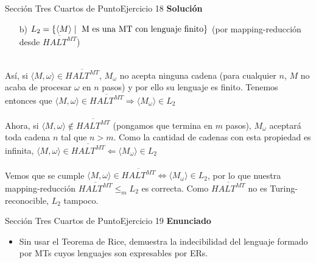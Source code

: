 \documentclass[10pt, envcountsect, presentation, aspectratio=169]{beamer}
\begin{document}

\begin{frame}{Sección Tres Cuartos de Punto}{Ejercicio 18}
    \textbf{Solución}\\
    \begin{itemize}
        \item[b)] $L_2=\{\langle M \rangle \mid \hbox{ M es una MT con lenguaje finito}  \}$ (por mapping-reducción desde $\overline{HALT^{MT}}$) \\~\\
    \end{itemize}
    Así, si $\langle M, \omega \rangle \in \overline{HALT^{MT}}$, $M_{\omega}$ no acepta ninguna cadena (para cualquier $n$, $M$ no acaba de procesar $\omega$ en $n$ pasos) y por ello su lenguaje es finito. Tenemos entonces que $\langle M, \omega \rangle \in \overline{HALT^{MT}} \Rightarrow \langle M_{\omega} \rangle \in L_2$\\~\\
    Ahora, si $\langle M, \omega \rangle \notin \overline{HALT^{MT}}$ (pongamos que termina en $m$ pasos), $M_\omega$ aceptará toda cadena $n$ tal que $n>m$. Como la cantidad de cadenas con esta propiedad es infinita, $\langle M, \omega \rangle \in \overline{HALT^{MT}} \Leftarrow \langle M_{\omega} \rangle \in L_2$\\~\\
    Vemos que se cumple $\langle M, \omega \rangle \in \overline{HALT^{MT}} \Leftrightarrow \langle M_{\omega} \rangle \in L_2$, por lo que nuestra  mapping-reducción $\overline{HALT^{MT}}\le_m L_2$ es correcta. Como $\overline{HALT^{MT}}$ no es Turing-reconocible, $L_2$ tampoco.  
\end{frame}


\begin{frame}{Sección Tres Cuartos de Punto}{Ejercicio 19}
        \textbf{Enunciado}
        \begin{itemize}
            \item Sin usar el Teorema de Rice, demuestra la indecibilidad del lenguaje formado por MTs cuyos lenguajes son expresables por ERs.
        \end{itemize}
    \end{frame}
    
\end{document}
